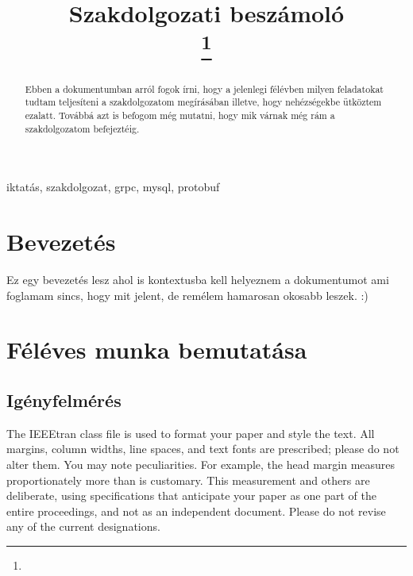 \documentclass[conference]{IEEEtran}
\begin{document}
\title{Szakdolgozati beszámoló\\

\thanks{}
}

\author{
}

\maketitle

\begin{abstract}
Ebben a dokumentumban arról fogok írni, hogy a jelenlegi félévben milyen feladatokat tudtam teljesíteni a szakdolgozatom megírásában illetve, hogy nehézségekbe ütköztem ezalatt. Továbbá azt is befogom még mutatni, hogy mik várnak még rám a szakdolgozatom befejeztéig. 
\end{abstract}

\begin{IEEEkeywords}
iktatás, szakdolgozat, grpc, mysql, protobuf
\end{IEEEkeywords}

\section{Bevezetés}
Ez egy bevezetés lesz ahol is kontextusba kell helyeznem a dokumentumot ami foglamam sincs, hogy mit jelent, de remélem hamarosan okosabb leszek. :)

\section{Féléves munka bemutatása}

\subsection{Igényfelmérés}

The IEEEtran class file is used to format your paper and style the text. All margins, 
column widths, line spaces, and text fonts are prescribed; please do not 
alter them. You may note peculiarities. For example, the head margin
measures proportionately more than is customary. This measurement 
and others are deliberate, using specifications that anticipate your paper 
as one part of the entire proceedings, and not as an independent document. 
Please do not revise any of the current designations.
\end{document}
